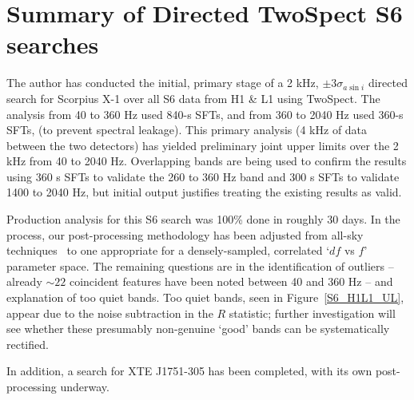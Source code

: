 \section{Summary of Directed TwoSpect S6 searches}

The author has conducted the initial, primary stage of a 2 kHz, $\pm 3 \sigma_{a \sin i}$ directed search for Scorpius X-1 over all S6 data from H1 \& L1 using TwoSpect.
The analysis from 40 to 360 Hz used 840-s SFTs,
and from 360 to 2040 Hz used 360-s SFTs,
(to prevent spectral leakage).
This primary analysis (4 kHz of data between the two detectors) has yielded preliminary joint upper limits over the 2 kHz from 40 to 2040 Hz.
Overlapping bands are being used to confirm the results using
360 s SFTs to validate the 260 to 360 Hz band and
300 s SFTs to validate 1400 to 2040 Hz, but initial output justifies treating the existing results as valid. 

Production analysis for this S6 search was 100\% done in roughly 30 days.
In the process, our post-processing methodology has been adjusted from all-sky techniques~\cite{GoetzTwoSpectResults2014} to one appropriate for a densely-sampled, correlated `$df$ vs $f$' parameter space.
The remaining questions are in the identification of outliers -- already $\sim 22$ coincident features have been noted between 40 and 360 Hz -- and explanation of too quiet bands.
Too quiet bands, seen in Figure~\ref{S6_H1L1_UL}, appear due to the noise subtraction in the $R$ statistic; further investigation will see whether these presumably non-genuine `good' bands can be systematically rectified.

In addition, a search for XTE J1751-305 has been completed, with its own post-processing underway.


